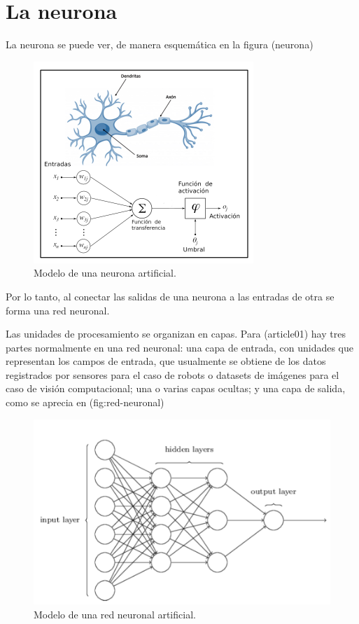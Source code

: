 \documentclass{article}
\begin{document}
  \section{La neurona}

  La neurona se puede ver, de manera esquemática en la figura (neurona)

  \begin{figure}[ht!]
    \centering
    \includegraphics[width=0.6\linewidth]{neurona}
    \caption{Modelo de una neurona artificial.}
  \end{figure}

  Por lo tanto, al conectar las salidas de una neurona a las entradas de otra se
  forma una red neuronal.

  Las unidades de procesamiento se organizan en capas. Para (article01) hay
  tres partes normalmente en una red neuronal: una capa de entrada, con unidades
  que representan los campos de entrada, que usualmente se obtiene de los datos
  registrados por sensores para el caso de robots o datasets de imágenes para el
  caso de visión computacional; una o varias capas ocultas; y una capa de
  salida, como se aprecia en (fig:red-neuronal)

  \begin{figure}[ht!]
    \centering
    \includegraphics[width=0.8\linewidth]{red-neuronal}
    \caption{Modelo de una red neuronal artificial.}
  \end{figure}
\end{document}
